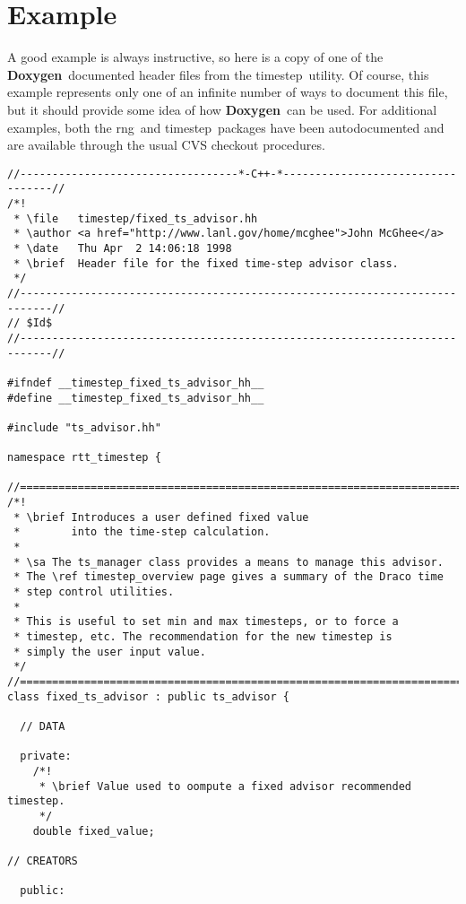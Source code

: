 \documentclass[11pt]{ResearchNote}
\newcommand{\doxy}{{\normalfont\bfseries Doxygen}}
\newcommand{\rng}{{\normalfont\sffamily rng}}
\newcommand{\timestep}{{\normalfont\sffamily timestep}}
\begin{document}

\section{Example}

A good example is always instructive, so here is a copy of
one of the \doxy\ documented header files from the \timestep\ utility.
Of course, this example represents only one of an infinite number of ways
to document this file, but it should provide some idea of how \doxy\
can be used.
For additional examples, both the \rng\ and \timestep\ packages have been
autodocumented and are available through the usual CVS checkout procedures.

\begin{verbatim}
//----------------------------------*-C++-*----------------------------------//
/*! 
 * \file   timestep/fixed_ts_advisor.hh
 * \author <a href="http://www.lanl.gov/home/mcghee">John McGhee</a>
 * \date   Thu Apr  2 14:06:18 1998
 * \brief  Header file for the fixed time-step advisor class.
 */
//---------------------------------------------------------------------------//
// $Id$
//---------------------------------------------------------------------------//

#ifndef __timestep_fixed_ts_advisor_hh__
#define __timestep_fixed_ts_advisor_hh__

#include "ts_advisor.hh"

namespace rtt_timestep {

//===========================================================================//
/*!
 * \brief Introduces a user defined fixed value 
 *        into the time-step calculation.
 *
 * \sa The ts_manager class provides a means to manage this advisor.
 * The \ref timestep_overview page gives a summary of the Draco time 
 * step control utilities. 
 *
 * This is useful to set min and max timesteps, or to force a
 * timestep, etc. The recommendation for the new timestep is
 * simply the user input value. 
 */ 
//===========================================================================//
class fixed_ts_advisor : public ts_advisor {

  // DATA

  private:
    /*!
     * \brief Value used to oompute a fixed advisor recommended timestep.
     */
    double fixed_value; 
   
// CREATORS

  public:


\end{verbatim}
\end{document}
